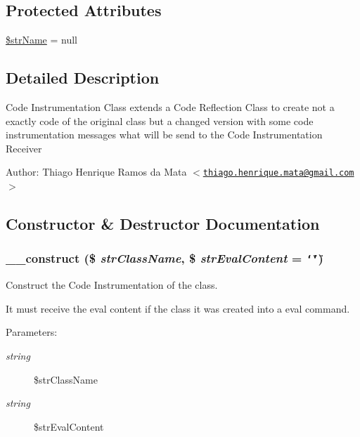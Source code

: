 \subsection*{Protected Attributes}
\begin{CompactItemize}
\item 
\hyperlink{class_code_instrumentation_class_90edf7538a74be8ac5ce46baaf203382}{\$strName} = null
\end{CompactItemize}


\subsection{Detailed Description}
Code Instrumentation Class extends a Code Reflection Class to create not a exactly code of the original class but a changed version with some code instrumentation messages what will be send to the Code Instrumentation Receiver

\begin{Desc}
\item[Author:]Thiago Henrique Ramos da Mata $<$\href{mailto:thiago.henrique.mata@gmail.com}{\tt thiago.henrique.mata@gmail.com}$>$ \end{Desc}


\subsection{Constructor \& Destructor Documentation}
\hypertarget{class_code_instrumentation_class_4df49469648d1e8de92c18bb8ac40b1b}{
\subsubsection[{\_\-\_\-construct}]{\setlength{\rightskip}{0pt plus 5cm}\_\-\_\-construct (\$ {\em strClassName}, \/  \$ {\em strEvalContent} = {\tt \char`\"{}\char`\"{}})}}
\label{class_code_instrumentation_class_4df49469648d1e8de92c18bb8ac40b1b}


Construct the Code Instrumentation of the class.

It must receive the eval content if the class it was created into a eval command.

\begin{Desc}
\item[Parameters:]
\begin{description}
\item[{\em string}]\$strClassName \item[{\em string}]\$strEvalContent \end{description}
\end{Desc}


